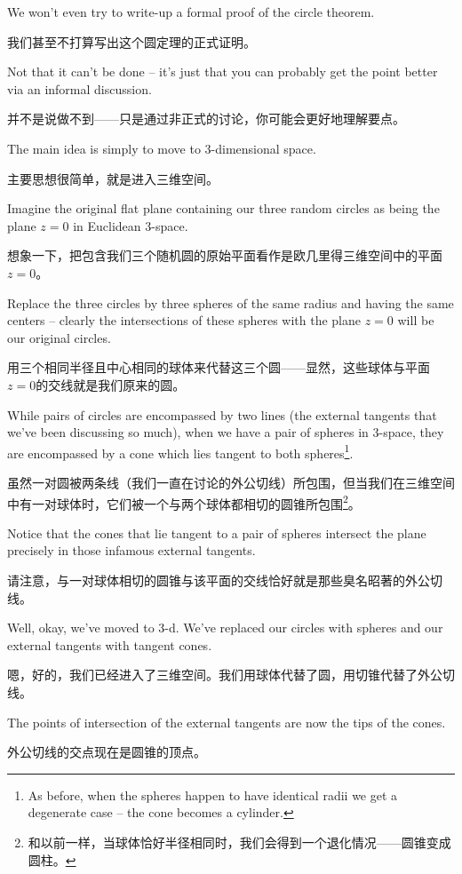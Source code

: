 We won't even try to write-up a formal proof of the circle theorem.

我们甚至不打算写出这个圆定理的正式证明。

Not that it can't be done -- it's just that you can probably get the
point better via an informal discussion.

并不是说做不到——只是通过非正式的讨论，你可能会更好地理解要点。

The main idea is simply to move to 3-dimensional space.

主要思想很简单，就是进入三维空间。

Imagine the
original flat plane containing our three random circles as being the
plane $z=0$ in Euclidean 3-space.

想象一下，把包含我们三个随机圆的原始平面看作是欧几里得三维空间中的平面$z=0$。

Replace the three circles by three
spheres of the same radius and having the same centers -- clearly the 
intersections of these spheres with the plane $z=0$ will be our original
circles.

用三个相同半径且中心相同的球体来代替这三个圆——显然，这些球体与平面$z=0$的交线就是我们原来的圆。

While pairs of circles are encompassed by two lines (the external
tangents that we've been discussing so much), when we have a pair of spheres
in 3-space, they are encompassed by a cone which lies tangent to both
spheres\footnote{As before, when the spheres happen to have identical radii %
we get a degenerate case -- the cone becomes a cylinder.}.

虽然一对圆被两条线（我们一直在讨论的外公切线）所包围，但当我们在三维空间中有一对球体时，它们被一个与两个球体都相切的圆锥所包围\footnote{和以前一样，当球体恰好半径相同时，我们会得到一个退化情况——圆锥变成圆柱。}。

Notice that 
the cones that lie tangent to a pair of spheres intersect the plane
precisely in those infamous external tangents.

请注意，与一对球体相切的圆锥与该平面的交线恰好就是那些臭名昭著的外公切线。

Well, okay, we've moved to 3-d.  We've replaced our circles with spheres
and our external tangents with tangent cones.

嗯，好的，我们已经进入了三维空间。我们用球体代替了圆，用切锥代替了外公切线。

The points of intersection
of the external tangents are now the tips of the cones.

外公切线的交点现在是圆锥的顶点。

